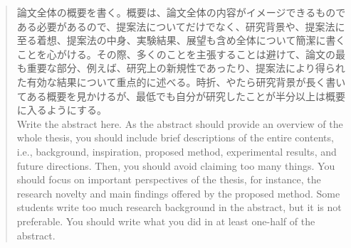 \documentclass[11pt,a4paper,twoside,openany]{book}
\begin{document}
\frontmatter
\maketitle

\begin{abstract}
 論文全体の概要を書く。概要は、論文全体の内容がイメージできるものである必要があるので、提案法についてだけでなく、研究背景や、提案法に至る着想、提案法の中身、実験結果、展望も含め全体について簡潔に書くことを心がける。その際、多くのことを主張することは避けて、論文の最も重要な部分、例えば、研究上の新規性であったり、提案法により得られた有効な結果について重点的に述べる。時折、やたら研究背景が長く書いてある概要を見かけるが、最低でも自分が研究したことが半分以上は概要に入るようにする。 \\

 Write the abstract here. As the abstract should provide an overview of the whole thesis, you should include brief descriptions of the entire contents, i.e., background, inspiration, proposed method, experimental results, and future directions. Then, you should avoid claiming too many things. You should focus on important perspectives of the thesis, for instance, the research novelty and main findings offered by the proposed method. Some students write too much research background in the abstract, but it is not preferable. You should write what you did in at least one-half of the abstract.
\end{abstract}

\tableofcontents %
\clearpage

\listoffigures %
\clearpage

\listoftables %
\clearpage

\mainmatter








\begin{acks}
  
\end{acks}
\end{document}
